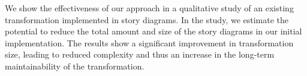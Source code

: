 We show the effectiveness of our approach in a qualitative study of an existing transformation implemented in story diagrams. In the study, we estimate the potential to reduce the total amount and size of the story diagrams in our initial implementation. The results show a significant improvement in transformation size, leading to reduced complexity and thus an increase in the long-term maintainability of the transformation.

